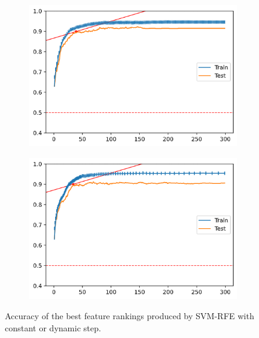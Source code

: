 \begin{figure}[H]
    \centering
    \begin{subfigure}[b]{0.4\linewidth}
        \includegraphics[width=\linewidth]{img/ch5/dstep/vanilla1.png}
    \end{subfigure}
    \begin{subfigure}[b]{0.4\linewidth}
        \includegraphics[width=\linewidth]{img/ch5/dstep/vanilla2.png}
    \end{subfigure}
    \caption{Accuracy of the best feature rankings produced by SVM-RFE with constant or dynamic step.}
    \label{fig:ch5.dstep.vanillabest}
\end{figure}


